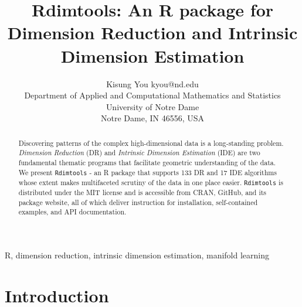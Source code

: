 \documentclass[twoside,11pt]{article}
\newcommand{\Rdimtools}{\texttt{Rdimtools} }
\begin{document}
\title{Rdimtools: An R package for Dimension Reduction and Intrinsic Dimension Estimation}

\author{\name Kisung You \email kyou@nd.edu \\
	\addr Department of Applied and Computational Mathematics and Statistics \\ 
	University of Notre Dame \\
	Notre Dame, IN 46556, USA}



\maketitle

\begin{abstract}%

Discovering patterns of the complex high-dimensional data is a long-standing problem. \textit{Dimension Reduction} (DR) and \textit{Intrinsic Dimension Estimation} (IDE) are two fundamental thematic programs that facilitate geometric understanding of the data. We present \Rdimtools - an R package that supports 133 DR and 17 IDE algorithms whose extent makes multifaceted scrutiny of the data in one place easier. \Rdimtools is distributed under the MIT license and is accessible from CRAN, GitHub, and its package website, all of which deliver instruction for installation, self-contained examples, and API documentation.
\end{abstract}

\begin{keywords}
R, dimension reduction, intrinsic dimension estimation, manifold learning
\end{keywords}



\section{Introduction}
\end{document}
